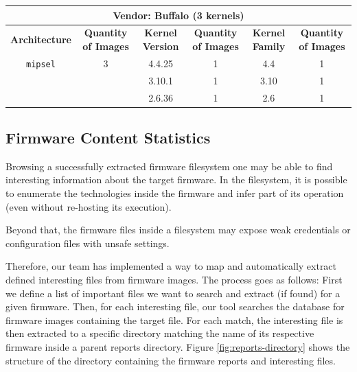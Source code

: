 \begin{table}[H]
{\begin{tabular}{|c|c|c|c|c|c|}
\multicolumn{6}{|c|}{\textbf{Vendor: Buffalo} (3 kernels)}                                                                    \\ \hline
\textbf{Architecture} & \multicolumn{1}{c|}{\textbf{Quantity of Images}} & \textbf{Kernel Version} & \multicolumn{1}{c|}{\textbf{Quantity of Images}} & \textbf{Kernel Family} & \textbf{Quantity of Images} \\ \hline
{\tt mipsel}            & \multicolumn{1}{c|}{3}                & 4.4.25                 & \multicolumn{1}{c|}{1}                            & 4.4                     & 1                          \\
                        & \multicolumn{1}{c|}{}                 & 3.10.1                  & \multicolumn{1}{c|}{1}                           & 3.10                    & 1                          \\
                        & \multicolumn{1}{c|}{}                 & 2.6.36                  & \multicolumn{1}{c|}{1}                           & 2.6                     & 1                          \\ \hline
\end{tabular}}
\label{tab:kernel-stats-by-vendor}
\end{table}

\subsection{Firmware Content Statistics}
\label{sec:firmware-content-statistics}

Browsing a successfully extracted firmware filesystem one may be able to find interesting information about the target firmware. In the filesystem, it is possible to enumerate the technologies inside the firmware and infer part of its operation (even without re-hosting its execution).

Beyond that, the firmware files inside a filesystem may expose weak credentials or configuration files with unsafe settings.

Therefore, our team has implemented a way to map and automatically extract defined interesting files from firmware images. The process goes as follows: First we define a list of important files we want to search and extract (if found) for a given firmware. Then, for each interesting file, our tool searches the database for firmware images containing the target file. For each match, the interesting file is then extracted to a specific directory matching the name of its respective firmware inside a parent reports directory. Figure \ref{fig:reports-directory} shows the structure of the directory containing the firmware reports and interesting files.


